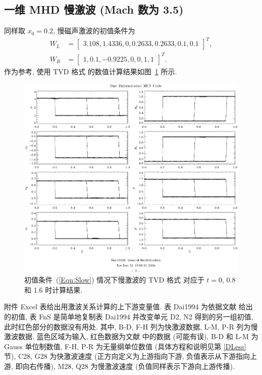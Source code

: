 \documentclass[10.5pt
]{article}
\begin{document}
\subsection{一维 MHD 慢激波 (Mach 数为 3.5)\citep{Dai1994}}
同样取 $x_0 = 0.2$, 慢磁声激波的初值条件为
\begin{align}
W_L &= \left[\begin{array}{ccccccc}
3.108,
1.4336,
0,
0.2633,
0.2633,
0.1,
0.1
\end{array}\right]^T,
\nonumber\\
W_R &= \left[\begin{array}{ccccccc}
1,
0.1,
-0.9225,
0,
0,
1,
1
\end{array}\right]^T.\label{Eqn:Slow}
\end{align}
作为参考, 使用 TVD 格式 \citep{vanLeer1974,Harten1983} 的数值计算结果如图~\ref{Fig:Slow} 所示.
\begin{figure}
\begin{center}
\includegraphics[height=.78\textwidth]{SShockNum.eps}
\caption{初值条件~(\ref{Eqn:Slow}) 情况下慢激波的 TVD 格式 \citep{vanLeer1974,Harten1983} 对应于 $t=0$, 0.8 和 1.6 时计算结果.}\label{Fig:Slow}
\end{center}
\end{figure}

附件 Excel 表给出用激波关系计算的上下游变量值. 表 Dai1994 为依据文献 \citet{Dai1994} 给出的初值, 表 FnS 是简单地复制表 Dai1994 并改变单元 D2, N2 得到的另一组初值,
此时红色部分的数据没有用处. 其中, B-D, F-H 列为快激波数据, L-M, P-R 列为慢激波数据. 蓝色区域为输入, 红色数据为文献 \citet{Dai1994} 中的数据 (可能有误), B-D 和 L-M 为
Gauss 单位制数值, F-H, P-R 为无量纲单位数值 (具体方程和说明见第 \ref{DLess} 节), C28, G28 为快激波速度 (正方向定义为上游指向下游, 负值表示从下游指向上游, 即向右传播),
M28, Q28 为慢激波速度 (负值同样表示下游向上游传播).
\end{document}
